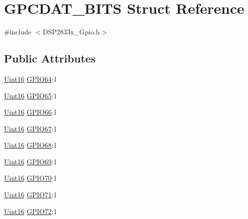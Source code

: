 \hypertarget{struct_g_p_c_d_a_t___b_i_t_s}{}\section{G\+P\+C\+D\+A\+T\+\_\+\+B\+I\+T\+S Struct Reference}
\label{struct_g_p_c_d_a_t___b_i_t_s}


{\ttfamily \#include $<$D\+S\+P2833x\+\_\+\+Gpio.\+h$>$}

\subsection*{Public Attributes}
\begin{DoxyCompactItemize}
\item 
\hyperlink{_d_s_p2833x___device_8h_a59a9f6be4562c327cbfb4f7e8e18f08b}{Uint16} \hyperlink{struct_g_p_c_d_a_t___b_i_t_s_ab71787e1e55c0766d59898ff9ff466bb}{G\+P\+I\+O64}\+:1
\item 
\hyperlink{_d_s_p2833x___device_8h_a59a9f6be4562c327cbfb4f7e8e18f08b}{Uint16} \hyperlink{struct_g_p_c_d_a_t___b_i_t_s_a5f8f07aeba497965bfcabf00d20ab964}{G\+P\+I\+O65}\+:1
\item 
\hyperlink{_d_s_p2833x___device_8h_a59a9f6be4562c327cbfb4f7e8e18f08b}{Uint16} \hyperlink{struct_g_p_c_d_a_t___b_i_t_s_abef768e55a699275c026a8cd135bf1ca}{G\+P\+I\+O66}\+:1
\item 
\hyperlink{_d_s_p2833x___device_8h_a59a9f6be4562c327cbfb4f7e8e18f08b}{Uint16} \hyperlink{struct_g_p_c_d_a_t___b_i_t_s_a6d7bf5681646bb84034dfd75c9c559d1}{G\+P\+I\+O67}\+:1
\item 
\hyperlink{_d_s_p2833x___device_8h_a59a9f6be4562c327cbfb4f7e8e18f08b}{Uint16} \hyperlink{struct_g_p_c_d_a_t___b_i_t_s_af202161895611cf66fa3623b8be9ab8f}{G\+P\+I\+O68}\+:1
\item 
\hyperlink{_d_s_p2833x___device_8h_a59a9f6be4562c327cbfb4f7e8e18f08b}{Uint16} \hyperlink{struct_g_p_c_d_a_t___b_i_t_s_aec69fce6b8296224ef2a545699d0bf0e}{G\+P\+I\+O69}\+:1
\item 
\hyperlink{_d_s_p2833x___device_8h_a59a9f6be4562c327cbfb4f7e8e18f08b}{Uint16} \hyperlink{struct_g_p_c_d_a_t___b_i_t_s_af2e29926116c6c6f77d783cb854c3d5b}{G\+P\+I\+O70}\+:1
\item 
\hyperlink{_d_s_p2833x___device_8h_a59a9f6be4562c327cbfb4f7e8e18f08b}{Uint16} \hyperlink{struct_g_p_c_d_a_t___b_i_t_s_aa38d65eb3e0f01be0c9fe3ceebf90bb8}{G\+P\+I\+O71}\+:1
\item 
\hyperlink{_d_s_p2833x___device_8h_a59a9f6be4562c327cbfb4f7e8e18f08b}{Uint16} \hyperlink{struct_g_p_c_d_a_t___b_i_t_s_af82d20bbd087a0818e84cdfca187c525}{G\+P\+I\+O72}\+:1

\end{DoxyCompactItemize}
